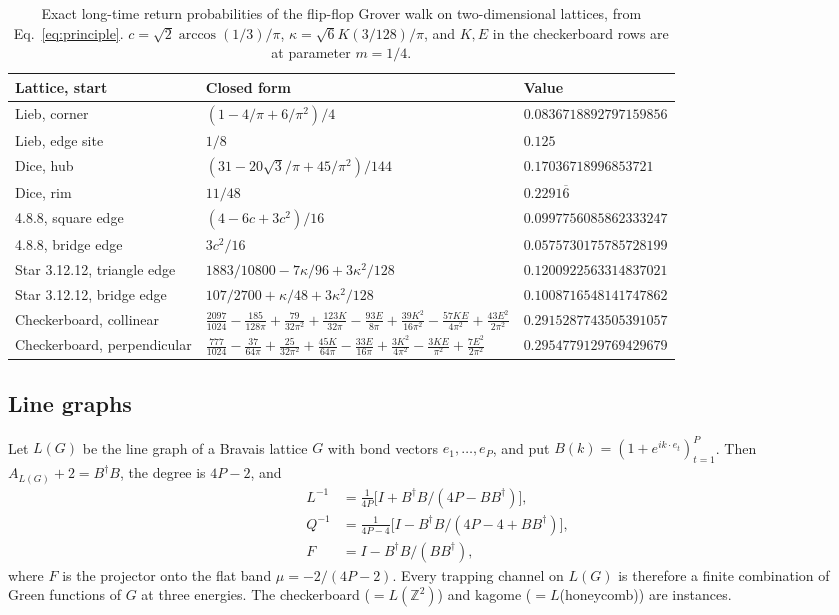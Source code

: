 \documentclass[aps,pra,10pt,twocolumn,superscriptaddress,nofootinbib]{revtex4-2}
\newcommand{\sq}{\sqrt{3}}
\begin{document}
\begin{table}
\caption{Exact long-time return probabilities of the flip-flop Grover walk on
two-dimensional lattices, from Eq.~\eqref{eq:principle}. $c=\sqrt2\arccos(1/3)/\pi$,
$\kappa=\sqrt6K(3/128)/\pi$, and $K,E$ in the checkerboard rows are at parameter $m=1/4$.}
\label{tab:2d}
\begin{ruledtabular}
\begin{tabular}{lll}
Lattice, start & Closed form & Value\\
\hline
Lieb, corner & $(1-4/\pi+6/\pi^2)/4$ & $0.0836718892797159856$\\
Lieb, edge site & $1/8$ & $0.125$\\
Dice, hub & $(31-20\sq/\pi+45/\pi^2)/144$ & $0.17036718996853721$\\
Dice, rim & $11/48$ & $0.2291\overline{6}$\\
4.8.8, square edge & $(4-6c+3c^2)/16$ & $0.0997756085862333247$\\
4.8.8, bridge edge & $3c^2/16$ & $0.0575730175785728199$\\
Star 3.12.12, triangle edge & $1883/10800-7\kappa/96+3\kappa^2/128$ & $0.1200922563314837021$\\
Star 3.12.12, bridge edge & $107/2700+\kappa/48+3\kappa^2/128$ & $0.1008716548141747862$\\
Checkerboard, collinear &
$\frac{2097}{1024}-\frac{185}{128\pi}+\frac{79}{32\pi^2}+\frac{123K}{32\pi}-\frac{93E}{8\pi}
+\frac{39K^2}{16\pi^2}-\frac{57KE}{4\pi^2}+\frac{43E^2}{2\pi^2}$ & $0.2915287743505391057$\\
Checkerboard, perpendicular &
$\frac{777}{1024}-\frac{37}{64\pi}+\frac{25}{32\pi^2}+\frac{45K}{64\pi}-\frac{33E}{16\pi}
+\frac{3K^2}{4\pi^2}-\frac{3KE}{\pi^2}+\frac{7E^2}{2\pi^2}$ & $0.2954779129769429679$\\
\end{tabular}
\end{ruledtabular}
\end{table}

\subsection{Line graphs}

Let $L(G)$ be the line graph of a Bravais lattice $G$ with bond vectors $e_1,\dots,e_P$, and put
$B(k)=(1+e^{ik\cdot e_t})_{t=1}^P$. Then $A_{L(G)}+2=B^\dagger B$, the degree is $4P-2$, and
\begin{align}
L^{-1}&=\tfrac1{4P}\bigl[I+B^\dagger B/(4P-BB^\dagger)\bigr],\\
Q^{-1}&=\tfrac1{4P-4}\bigl[I-B^\dagger B/(4P-4+BB^\dagger)\bigr],\\
F&=I-B^\dagger B/(BB^\dagger),
\end{align}
where $F$ is the projector onto the flat band $\mu=-2/(4P-2)$. Every trapping channel on
$L(G)$ is therefore a finite combination of Green functions of $G$ at three energies.
The checkerboard ($=L(\mathbb{Z}^2)$) and kagome ($=L$(honeycomb)) are instances.
\end{document}
